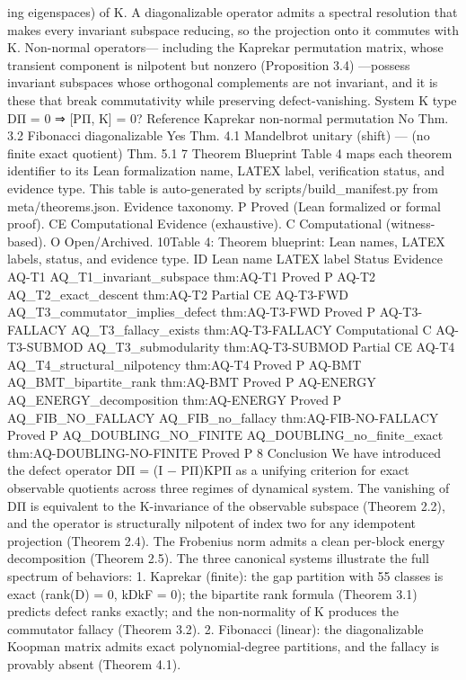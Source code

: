 ing eigenspaces) of K. A diagonalizable operator admits a spectral resolution that makes every
invariant subspace reducing, so the projection onto it commutes with K. Non-normal operators—
including the Kaprekar permutation matrix, whose transient component is nilpotent but nonzero
(Proposition 3.4) —possess invariant subspaces whose orthogonal complements are not invariant,
and it is these that break commutativity while preserving defect-vanishing.
System K type DΠ = 0 ⇒ [PΠ, K] = 0? Reference
Kaprekar non-normal permutation No Thm. 3.2
Fibonacci diagonalizable Yes Thm. 4.1
Mandelbrot unitary (shift) — (no finite exact quotient) Thm. 5.1
7 Theorem Blueprint
Table 4 maps each theorem identifier to its Lean formalization name, LATEX label, verification
status, and evidence type. This table is auto-generated by scripts/build_manifest.py from
meta/theorems.json.
Evidence taxonomy.
P Proved (Lean formalized or formal proof).
CE Computational Evidence (exhaustive).
C Computational (witness-based).
O Open/Archived.
10Table 4: Theorem blueprint: Lean names, LATEX labels, status, and evidence type.
ID Lean name LATEX label Status Evidence
AQ-T1 AQ_T1_invariant_subspace thm:AQ-T1 Proved P
AQ-T2 AQ_T2_exact_descent thm:AQ-T2 Partial CE
AQ-T3-FWD AQ_T3_commutator_implies_defect thm:AQ-T3-FWD Proved P
AQ-T3-FALLACY AQ_T3_fallacy_exists thm:AQ-T3-FALLACY Computational C
AQ-T3-SUBMOD AQ_T3_submodularity thm:AQ-T3-SUBMOD Partial CE
AQ-T4 AQ_T4_structural_nilpotency thm:AQ-T4 Proved P
AQ-BMT AQ_BMT_bipartite_rank thm:AQ-BMT Proved P
AQ-ENERGY AQ_ENERGY_decomposition thm:AQ-ENERGY Proved P
AQ_FIB_NO_FALLACY AQ_FIB_no_fallacy thm:AQ-FIB-NO-FALLACY Proved P
AQ_DOUBLING_NO_FINITE AQ_DOUBLING_no_finite_exact thm:AQ-DOUBLING-NO-FINITE Proved P
8 Conclusion
We have introduced the defect operator DΠ = (I − PΠ)KPΠ as a unifying criterion for exact
observable quotients across three regimes of dynamical system. The vanishing of DΠ is equivalent
to the K-invariance of the observable subspace (Theorem 2.2), and the operator is structurally
nilpotent of index two for any idempotent projection (Theorem 2.4). The Frobenius norm admits
a clean per-block energy decomposition (Theorem 2.5).
The three canonical systems illustrate the full spectrum of behaviors:
1. Kaprekar (finite): the gap partition with 55 classes is exact (rank(D) = 0, kDkF = 0); the
bipartite rank formula (Theorem 3.1) predicts defect ranks exactly; and the non-normality of
K produces the commutator fallacy (Theorem 3.2).
2. Fibonacci (linear): the diagonalizable Koopman matrix admits exact polynomial-degree
partitions, and the fallacy is provably absent (Theorem 4.1).
